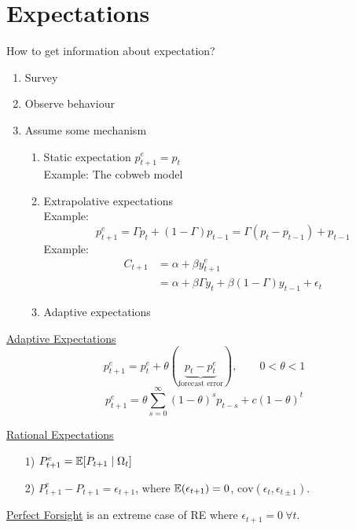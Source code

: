 \documentclass[twoside]{article}
\begin{document}
\section{Expectations}
How to get information about expectation?
\begin{enumerate}
    \item Survey
    \item Observe behaviour
    \item Assume some mechanism
    \begin{enumerate}
        \item Static expectation $p^{e}_{t+1} = p_{t}$\\
        Example: The cobweb model
        \item Extrapolative expectations\\
        Example:
        \begin{equation}
            p^{e}_{t+1} = \Gamma p_{t} + (1- \Gamma)p_{t-1} = \Gamma (p_{t} - p_{t-1}) + p_{t-1}
        \end{equation}
        Example:
        \begin{equation}
        \begin{aligned}
            C_{t+1} &= \alpha + \beta y^{e}_{t+1}\\
            &= \alpha + \beta \Gamma y_{t} + \beta (1- \Gamma) y_{t-1} + \epsilon_{t}
        \end{aligned}
        \end{equation}
        \item Adaptive expectations
    \end{enumerate}
\end{enumerate}

\underline{Adaptive Expectations}
\begin{equation}
    p^{e}_{t+1} = p^{e}_{t} + \theta (\underbrace{p_{t} - p^{e}_{t}}_{\text{forecast error}}), \qquad 0 < \theta < 1
\end{equation}
\begin{equation}
    p^{e}_{t+1} = \theta \sum_{s=0}^{\infty}(1- \theta)^{s} p_{t-s} + c (1 - \theta)^{t}
\end{equation}

\underline{Rational Expectations}
\begin{itemize}
    \item [1)] $P^{e}_{t+1} = \mathbb{E} [P_{t+1} \mid \Omega_{t}]$
    \item [2)] $P^{e}_{t+1} - P_{t+1} = \epsilon_{t+1}$, where $\mathbb{E} (\epsilon_{t+1}) = 0$, $\text{cov}(\epsilon_{t}, \epsilon_{t \pm 1})$.
\end{itemize}
\underline{Perfect Forsight} is an extreme case of RE  where $\epsilon_{t+1} = 0 ~ \forall t$.
\end{document}
